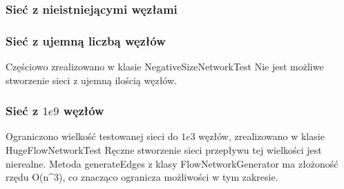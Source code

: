 

\subsubsection{Sieć z nieistniejącymi węzłami}


\subsubsection{Sieć z ujemną liczbą węzłów}
Częściowo zrealizowano w klasie NegativeSizeNetworkTest Nie jest możliwe
stworzenie sieci z ujemną ilością węzłów.

\subsubsection{Sieć z $1e9$ węzłów}
Ograniczono wielkość testowanej sieci do $1e3$ węzłów, zrealizowano w klasie
HugeFlowNetworkTest Ręczne stworzenie sieci przepływu tej wielkości jest
nierealne. Metoda generateEdges z klasy FlowNetworkGenerator ma złożoność
rzędu O(n^3), co znacząco ogranicza możliwości w tym zakresie.
